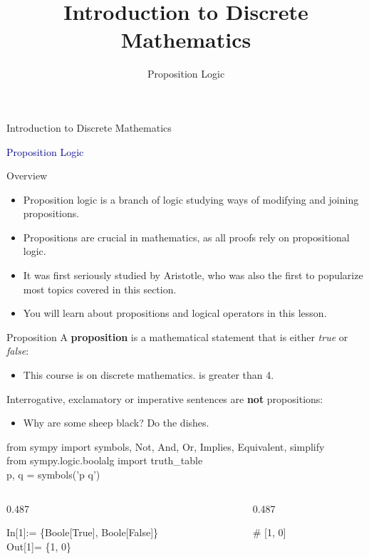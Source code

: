 \documentclass[aspectratio=169]{beamer}
\title{Introduction to Discrete Mathematics}
\subtitle{Proposition Logic}
\date{}
\newcommand{\dualcols}[2]{%
  \begin{columns}[T,onlytextwidth]
    \begin{column}{0.487\textwidth}
      \begin{tcolorbox}[wfstyle]#1\end{tcolorbox}
    \end{column}
    \begin{column}{0.487\textwidth}
      \begin{tcolorbox}[spstyle]#2\end{tcolorbox}
    \end{column}
  \end{columns}
}
\begin{document}
\begin{frame}[t]
  \vspace{3em}\centering
  {
    Introduction to Discrete Mathematics\par}
  \vspace{0.4em}
  {\large\textcolor{darkblue}{Proposition Logic}\par}
\end{frame}

\begin{frame}[t]{Overview}
  \begin{itemize}\setlength\itemsep{0.6em}
    \item Proposition logic is a branch of logic studying ways of modifying and joining propositions.
    \item Propositions are crucial in mathematics, as all proofs rely on propositional logic.
    \item It was first seriously studied by Aristotle, who was also the first to popularize most topics covered in this section.
    \item You will learn about propositions and logical operators in this lesson.
  \end{itemize}
\end{frame}

\begin{frame}[t]{Proposition}
  A \textbf{proposition} is a mathematical statement that is either \emph{true} or \emph{false}:
  \begin{itemize}\setlength\itemsep{0.05em}
    \item This course is on discrete mathematics. \quad
          \textbullet{} is greater than 4.
  \end{itemize}
  Interrogative, exclamatory or imperative sentences are \textbf{not} propositions:
  \begin{itemize}\setlength\itemsep{0.05em}
    \item Why are some sheep black? \quad
          \textbullet\quad Do the dishes.
  \end{itemize}
  \vspace{0.3em}
  \begin{tcolorbox}[setupstyle]
    from sympy import symbols, Not, And, Or, Implies, Equivalent,
    simplify\\
    from sympy.logic.boolalg import truth\_table\\
    p, q = symbols('p q')
  \end{tcolorbox}
  \vspace{0.2em}
  \dualcols{%
    In[1]:= \{Boole[True], Boole[False]\}\\
    Out[1]= \{1, 0\}
  }{%
    [int(True), int(False)] \# [1, 0]
  }
\end{frame}
\end{document}
